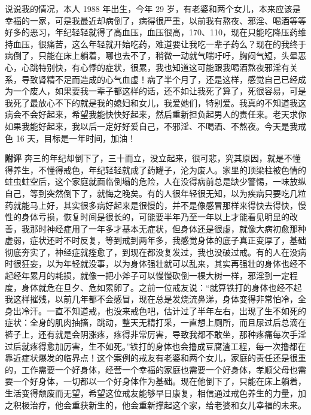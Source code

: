 \begin{case}
    说说我的情况，本人 1988 年出生，今年 29 岁，有老婆和两个女儿，本来应该是幸福的一家，可是我最近却病倒了，病得很严重，以前我有熬夜、邪淫、喝酒等等好多的恶习，年纪轻轻就得了高血压，血压很高，170、110，现在只能吃降压药维持血压，很痛苦，这么年轻就开始吃药，难道要让我吃一辈子药么？现在的我终于病倒了，只能在床上躺着，哪也去不了，稍微一动就气喘吁吁，胸闷气短，头晕恶心，心跳特别快，有心悸的症状，很累，我也知道这可能跟我喝酒熬夜邪淫有关系，导致肾精不足而造成的心气血虚！病了半个月了，还是这样，感觉自己已经成为一个废人，如果要我一辈子都这样的话，还不如让我死了算了，死很容易，可是我死了最放心不下的就是我的媳妇和女儿，我爱她们，特别爱。我真的不知道我这病会不会好起来，希望我能快快好起来，然后重新担负起男人的责任来。老天求你如果我能好起来，我以后一定好好爱自己，不邪淫、不喝酒、不熬夜。今天是我戒色 16 天，目标是一年时间，加油！

    \textbf{附评} 奔三的年纪却倒下了，三十而立，没立起来，很可悲，究其原因，就是不懂得养生，不懂得戒色，年纪轻轻就成了药罐子，沦为废人。家里的顶梁柱被色情的蛀虫蛀空后，这个家庭就面临倒塌的危险，人在没得病前总是缺少警惕，一味放纵自己，等到突然倒下了，就悔之晚矣。有的人很年轻很无知，以为疾病只要吃几粒药就能马上好，其实很多病好起来是很慢的，并不是像感冒那样来得快去得快，慢性的身体亏损，恢复时间是很长的，可能要半年乃至一年以上才能看见明显的改善，我那时神经症用了一年多才基本无症状，但身体还是很虚，就像大病初愈那种虚弱，症状还时不时反复，等到戒到两年多，我感觉身体的底子真正变厚了，基础彻底夯实了，神经症就痊愈了，到现在都没复发过，我也没破过戒。有的人在没病时很狂妄，以为年轻就没事，以为身体强壮就可以乱来，其实再强壮的身体也经不起经年累月的耗损，就像一把小斧子可以慢慢砍倒一棵大树一样，邪淫到一定程度，身体就危在旦夕、危如累卵了。之前一位戒友说：“就算铁打的身体也经不起我这样摧残，以前几年都不会感冒，现在总是发烧流鼻涕，身体变得非常怕冷，全身出冷汗。一直不知道戒，也没来戒色吧，估计过了半年左右，出现了生不如死的症状：全身的肌肉抽搐，跳动，整天无精打采，一直想上厕所，而且尿过后总滴在裤子上，还有就是会阴涨疼，疼得非常厉害，导致我都不敢坐，那种疼痛每次手淫过后就疼得愈加厉害，生不如死。”铁打的身体也会撸成豆腐渣工程，每一次撸都在靠近症状爆发的临界点！这个案例的戒友有老婆和两个女儿，家庭的责任还是很重的，工作需要一个好身体，经营一个幸福的家庭也需要一个好身体，孝顺父母也需要一个好身体，一切都以一个好身体作为基础。现在他倒下了，只能在床上躺着，生活变得颓废而无望，希望这位戒友能够早日康复，相信通过戒色养生的力量，加之积极治疗，他会重获新生的，他会重新撑起这个家，给老婆和女儿幸福的未来。
\end{case}

